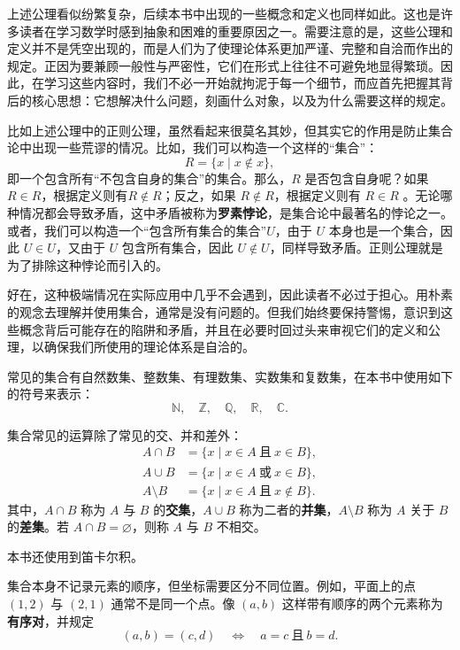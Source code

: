 上述公理看似纷繁复杂，后续本书中出现的一些概念和定义也同样如此。这也是许多读者在学习数学时感到抽象和困难的重要原因之一。需要注意的是，这些公理和定义并不是凭空出现的，而是人们为了使理论体系更加严谨、完整和自洽而作出的规定。正因为要兼顾一般性与严密性，它们在形式上往往不可避免地显得繁琐。因此，在学习这些内容时，我们不必一开始就拘泥于每一个细节，而应首先把握其背后的核心思想：它想解决什么问题，刻画什么对象，以及为什么需要这样的规定。

比如上述公理中的正则公理，虽然看起来很莫名其妙，但其实它的作用是防止集合论中出现一些荒谬的情况。比如，我们可以构造一个这样的``集合''：
\[
    R=\{x\mid x\notin x\},
\]
即一个包含所有``不包含自身的集合''的集合。那么，\(R\) 是否包含自身呢？如果\( R \in R \)，根据定义则有\(R \notin R\)；反之，如果 \( R \notin R \)，根据定义则有 \(R \in R\) 。无论哪种情况都会导致矛盾，这中矛盾被称为\textbf{罗素悖论}，是集合论中最著名的悖论之一。或者，我们可以构造一个``包含所有集合的集合''\( U \)，由于 \( U \) 本身也是一个集合，因此 \( U \in U \)，又由于 \( U \) 包含所有集合，因此 \( U \notin U \)，同样导致矛盾。正则公理就是为了排除这种悖论而引入的。

好在，这种极端情况在实际应用中几乎不会遇到，因此读者不必过于担心。用朴素的观念去理解并使用集合，通常是没有问题的。但我们始终要保持警惕，意识到这些概念背后可能存在的陷阱和矛盾，并且在必要时回过头来审视它们的定义和公理，以确保我们所使用的理论体系是自洽的。

常见的集合有自然数集、整数集、有理数集、实数集和复数集，在本书中使用如下的符号来表示：
\[
    \mathbb{N},\quad \mathbb{Z},\quad \mathbb{Q},\quad \mathbb{R},\quad \mathbb{C}.
\]

集合常见的运算除了常见的交、并和差外：
\begin{align*}
    A\cap B
     & =\{x\mid x\in A\ \text{且}\ x\in B\},    \\
    A\cup B
     & =\{x\mid x\in A\ \text{或}\ x\in B\},    \\
    A\setminus B
     & =\{x\mid x\in A\ \text{且}\ x\notin B\}.
\end{align*}
其中，\(A\cap B\) 称为 \(A\) 与 \(B\) 的\textbf{交集}，\(A\cup B\) 称为二者的\textbf{并集}，\(A\setminus B\) 称为 \(A\) 关于 \(B\) 的\textbf{差集}。若 \(A\cap B=\varnothing\)，则称 \(A\) 与 \(B\) 不相交。

本书还使用到笛卡尔积。

集合本身不记录元素的顺序，但坐标需要区分不同位置。例如，平面上的点 \((1,2)\) 与 \((2,1)\) 通常不是同一个点。像 \((a,b)\) 这样带有顺序的两个元素称为\textbf{有序对}，并规定
\[
    (a,b)=(c,d)
    \quad\Longleftrightarrow\quad
    a=c\ \text{且}\ b=d.
\]

